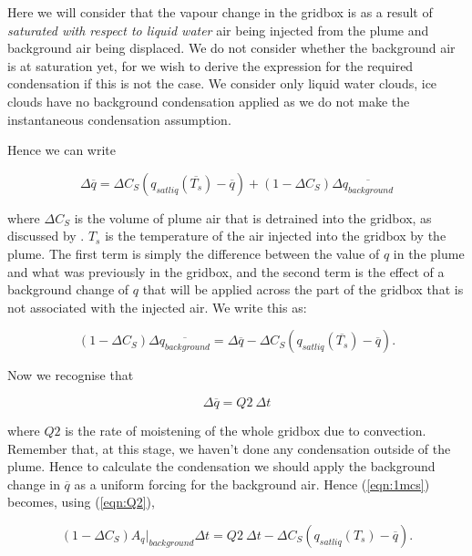 \documentclass{UMDP_article}
\begin{document}
Here we will consider that the vapour change in the gridbox is as a result of
\textit{saturated with respect to liquid water} air being injected
from the plume and background air being displaced.
We do not consider whether the background air is at saturation yet, for we wish
to derive the expression for the required condensation if this is not the case.
We consider only liquid water clouds, ice clouds have no background condensation
applied as we do not make the instantaneous condensation assumption.

Hence we can write

\begin{equation}
\Delta \overline{q} = \Delta C_S ( q_{sat liq}(\overline{T_{s}}) - \overline{q} )
+ (1 - \Delta C_S) \Delta \overline{q_{background}}
\end{equation}

where $\Delta C_S$ is the volume of plume air that is detrained into the gridbox,
as discussed by \cite{bwg03}. $T_s$ is the temperature of the air injected into
the gridbox by the plume. The first term is simply the difference
between the value of $q$ in the plume and what was previously in the gridbox, and
the second term is the effect of a background change of $q$ that will be applied
across the part of the gridbox that is not associated with the injected air. We write this as:

\begin{equation}
(1 - \Delta C_S) \Delta \overline{q_{background}} = \Delta \overline{q} - 
\Delta C_S ( q_{sat liq}(\overline{T_{s}}) - \overline{q} ) .
\label{eqn:1mcs}
\end{equation}

Now we recognise that

\begin{equation}
\Delta \overline{q} = Q2~ \Delta t
\label{eqn:Q2}
\end{equation}

where $Q2$ is the rate of moistening of the whole gridbox due to convection.
Remember that, at this stage, we haven't done any condensation outside of the plume.
Hence to calculate the condensation we should apply the background change in $\overline{q}$
as a uniform forcing for the background air. Hence (\ref{eqn:1mcs}) becomes, using
(\ref{eqn:Q2}),

\begin{equation}
(1 - \Delta C_S) A_q |_{background} \Delta t =  Q2 ~ \Delta t - \Delta C_S
( q_{sat liq}(T_{s}) - \overline{q} ) .
\label{eqn:Aq}
\end{equation}
\end{document}
